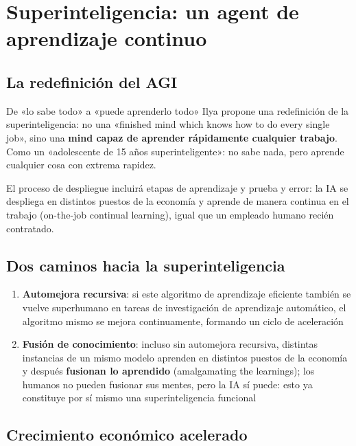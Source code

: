 \section{Superinteligencia: un agent de aprendizaje continuo}

\subsection{La redefinición del AGI}

\begin{importantbox}{De «lo sabe todo» a «puede aprenderlo todo»}
Ilya propone una redefinición de la superinteligencia: no una «finished mind which knows how to do every single job», sino una \textbf{mind capaz de aprender rápidamente cualquier trabajo}. Como un «adolescente de 15 años superinteligente»: no sabe nada, pero aprende cualquier cosa con extrema rapidez.
\end{importantbox}

El proceso de despliegue incluirá etapas de aprendizaje y prueba y error: la IA se despliega en distintos puestos de la economía y aprende de manera continua en el trabajo (on-the-job continual learning), igual que un empleado humano recién contratado.

\subsection{Dos caminos hacia la superinteligencia}

\begin{enumerate}
    \item \textbf{Automejora recursiva}: si este algoritmo de aprendizaje eficiente también se vuelve superhumano en tareas de investigación de aprendizaje automático, el algoritmo mismo se mejora continuamente, formando un ciclo de aceleración
    \item \textbf{Fusión de conocimiento}: incluso sin automejora recursiva, distintas instancias de un mismo modelo aprenden en distintos puestos de la economía y después \textbf{fusionan lo aprendido} (amalgamating the learnings); los humanos no pueden fusionar sus mentes, pero la IA sí puede: esto ya constituye por sí mismo una superinteligencia funcional
\end{enumerate}

\subsection{Crecimiento económico acelerado}


